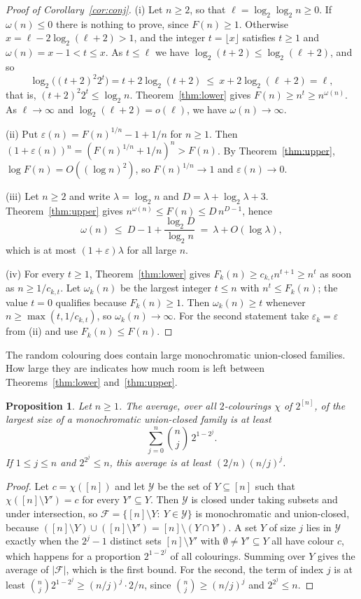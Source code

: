 \documentclass[11pt,reqno]{amsart}
\numberwithin{equation}{section}
\theoremstyle{plain}
\newtheorem{proposition}[theorem]{Proposition}
\theoremstyle{definition}
\theoremstyle{remark}
\newcommand{\cF}{\mathcal{F}}
\newcommand{\cY}{\mathcal{Y}}
\newcommand{\eps}{\varepsilon}
\begin{document}
\begin{proof}[Proof of Corollary~\ref{cor:conj}]
(i) Let $n\ge2$, so that $\ell=\log_2\log_2n\ge0$. If $\omega(n)\le0$
there is nothing to prove, since $F(n)\ge1$. Otherwise
$x=\ell-2\log_2(\ell+2)>1$, and the integer $t=\lfloor x\rfloor$
satisfies $t\ge1$ and $\omega(n)=x-1<t\le x$. As $t\le\ell$ we have
$\log_2(t+2)\le\log_2(\ell+2)$, and so
\[
\log_2\bigl((t+2)^{2}2^{t}\bigr)=t+2\log_2(t+2)\ \le\ x+2\log_2(\ell+2)=\ell ,
\]
that is, $(t+2)^{2}2^{t}\le\log_2n$. Theorem~\ref{thm:lower} gives
$F(n)\ge n^{t}\ge n^{\omega(n)}$. As $\ell\to\infty$ and
$\log_2(\ell+2)=o(\ell)$, we have $\omega(n)\to\infty$.

(ii) Put $\eps(n)=F(n)^{1/n}-1+1/n$ for $n\ge1$. Then
$(1+\eps(n))^{n}=(F(n)^{1/n}+1/n)^{n}>F(n)$. By Theorem~\ref{thm:upper},
$\log F(n)=O((\log n)^{2})$, so $F(n)^{1/n}\to1$ and $\eps(n)\to0$.

(iii) Let $n\ge2$ and write $\lambda=\log_2n$ and
$D=\lambda+\log_2\lambda+3$. Theorem~\ref{thm:upper} gives
$n^{\omega(n)}\le F(n)\le D\,n^{D-1}$, hence
\[
\omega(n)\ \le\ D-1+\frac{\log_2D}{\log_2n}
\ =\ \lambda+O(\log\lambda),
\]
which is at most $(1+\eps)\lambda$ for all large $n$.

(iv) For every $t\ge1$, Theorem~\ref{thm:lower} gives $F_k(n)\ge
c_{k,t}n^{t+1}\ge n^{t}$ as soon as $n\ge1/c_{k,t}$. Let $\omega_k(n)$ be
the largest integer $t\le n$ with $n^{t}\le F_k(n)$; the value $t=0$
qualifies because $F_k(n)\ge1$. Then $\omega_k(n)\ge t$ whenever $n\ge
\max(t,1/c_{k,t})$, so $\omega_k(n)\to\infty$. For the second statement
take $\eps_k=\eps$ from (ii) and use $F_k(n)\le F(n)$.
\end{proof}

The random colouring does contain large monochromatic union-closed
families. How large they are indicates how much room is left between
Theorems~\ref{thm:lower} and~\ref{thm:upper}.

\begin{proposition}
\label{prop:random}
Let $n\ge1$. The average, over all $2$-colourings $\chi$ of $2^{[n]}$, of
the largest size of a monochromatic union-closed family is at least
\[
\sum_{j=0}^{n}\binom nj\,2^{1-2^{j}} .
\]
If $1\le j\le n$ and $2^{2^{j}}\le n$, this average is at least
$(2/n)(n/j)^{j}$.
\end{proposition}

\begin{proof}
Let $c=\chi([n])$ and let $\cY$ be the set of $Y\subseteq[n]$ such that
$\chi([n]\setminus Y')=c$ for every $Y'\subseteq Y$. Then $\cY$ is closed
under taking subsets and under intersection, so
$\cF=\{[n]\setminus Y:\ Y\in\cY\}$ is monochromatic and union-closed,
because $([n]\setminus Y)\cup([n]\setminus Y')=[n]\setminus(Y\cap Y')$.
A set $Y$ of size $j$ lies in $\cY$ exactly when the $2^{j}-1$ distinct
sets $[n]\setminus Y'$ with $\emptyset\ne Y'\subseteq Y$ all have colour
$c$, which happens for a proportion $2^{1-2^{j}}$ of all colourings.
Summing over $Y$ gives the average of $|\cF|$, which is the first bound.
For the second, the term of index $j$ is at least
$\binom nj2^{1-2^{j}}\ge(n/j)^{j}\cdot2/n$, since $\binom nj\ge(n/j)^{j}$
and $2^{2^{j}}\le n$.
\end{proof}
\end{document}
